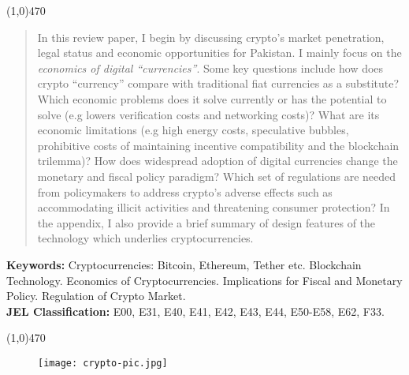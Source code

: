 \documentclass[12pt]{article}
\newcommand{\1}{\mathbbm 1}
\begin{document}
		

		

	
	
	
		
		\begin{center}
			\line(1,0){470}
		\end{center}
		\begin{spacing}{1.1}
			\vspace{-3ex}
			\begin{abstract}
				\noindent 
				In this review paper, I begin by discussing crypto's market penetration, legal status and economic opportunities for Pakistan. I mainly focus on the \textit{economics of digital ``currencies''}. Some key questions include how does crypto ``currency'' compare with traditional fiat currencies as a substitute? Which economic problems does it solve currently or has the potential to solve (e.g lowers verification costs and networking costs)? What are its economic limitations (e.g high energy costs, speculative bubbles, prohibitive costs of maintaining incentive compatibility and the blockchain trilemma)? How does widespread adoption of digital currencies change the monetary and fiscal policy paradigm? Which set of regulations are needed from policymakers to address crypto's adverse effects such as accommodating illicit activities and threatening consumer protection? In the appendix, I also provide a brief summary of design features of the technology which underlies cryptocurrencies.
			\end{abstract}
		\end{spacing}
		\textbf{Keywords:} Cryptocurrencies: Bitcoin, Ethereum, Tether etc. Blockchain Technology. Economics of Cryptocurrencies. Implications for Fiscal and Monetary Policy. Regulation of Crypto Market. {}\\
		\textbf{JEL Classification:} E00, E31, E40, E41, E42, E43, E44, E50-E58, E62, F33.
		\\
		\begin{center}
			\vspace{-8ex}
			\line(1,0){470}
		\end{center}
		\baselineskip=18pt 
		
		\newpage{}
		
			\begin{figure}[H]
			\begin{center}
				\texttt{[image: crypto-pic.jpg]}		
				\caption*{}
			\end{center}
		\end{figure}
		
\end{document}
